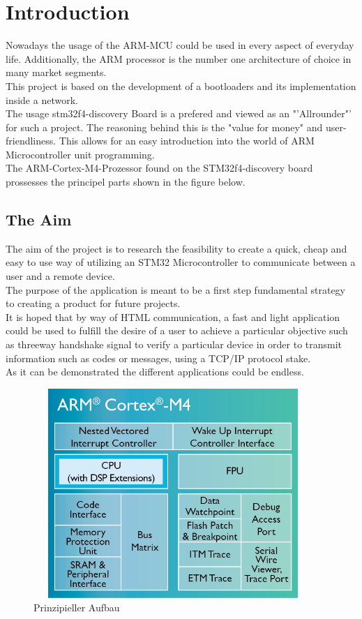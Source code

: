 \chapter{Introduction}
 
Nowadays the usage of the ARM-MCU could be used in every aspect of everyday life.
Additionally, the ARM processor is the number one architecture of choice in 
many market segments.\\ 
This project is based on the development of a bootloaders and its implementation 
inside a network.\\
The usage stm32f4-discovery Board is a prefered and viewed as an "'Allrounder"'
for such a project. The reasoning behind this is the "value for money" and 
user-friendliness. This allows for an easy introduction into the world of ARM
Microcontroller unit programming.\\
The ARM-Cortex-M4-Prozessor found on the STM32f4-discovery board prossesses 
the principel parts shown in the figure below.\\
\section{The Aim}
The aim of the project is to research the feasibility to create a quick, cheap 
and easy to use way of utilizing an STM32 Microcontroller to communicate between 
a user and a remote device.\\
The purpose of the application is meant to be a first step fundamental strategy to 
creating a product for future projects.\\
It is hoped that by way of HTML communication, a fast and light application could 
be used to fulfill the desire of a user to achieve a particular objective such 
as threeway handshake signal to verify a particular device in order to transmit 
information such as codes or messages, using a TCP/IP protocol stake.\\
As it can be demonstrated the different applications could be endless.\\ 

\begin{figure}[ht]
	\centering
	\includegraphics[width=400px, height=300px]{../img/Cortex-M4-chip-diagram-LG.png}
	\caption{Prinzipieller Aufbau}
	\label{m4_prinzip}
\end{figure}

